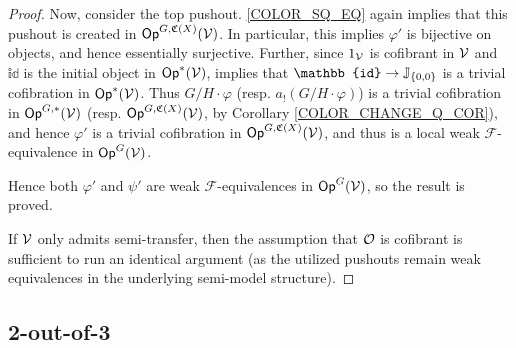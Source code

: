 \documentclass[a4paper,10pt
,draft
]{article}%
\renewcommand{\phi}{\varphi}
\renewcommand{\F}{\mathcal F}
\newcommand{\J}{\mathbb J}
\renewcommand{\1}{\ensuremath{\mathbb{id}}}
\begin{document}
\begin{proof}
      Now, consider the top pushout. \eqref{COLOR_SQ_EQ} again implies that this pushout is created in $\mathsf{Op}^{G, \mathfrak C(X)}(\mathcal V)$.
      In particular, this implies $\phi'$ is bijective on objects, and hence essentially surjective.
      Further, since $1_{\mathcal V}$ is cofibrant in $\mathcal V$ and $\1$ is the initial object in $\Op^{\**}(\V)$,
      \cite[Thm. 1.15]{BM13} implies that $\1 \to \J_{\set{0,0}}$ is a trivial cofibration in $\Op^{\**}(\V)$.
      Thus $G/H \cdot \phi$ (resp. $a_! (G/H \cdot \phi)$) is a trivial cofibration in $\Op^{G, \**}(\V)$
      (resp. $\mathsf{Op}^{G, \mathfrak C(X)}(\mathcal V)$, by Corollary \ref{COLOR_CHANGE_Q_COR}),
      and hence $\phi'$ is a trivial cofibration in $\mathsf{Op}^{G,\mathfrak C(X)}(\mathcal V)$,
      and thus is a local weak $\F$-equivalence in $\mathsf{Op}^G(\mathcal V)$.

      Hence both $\phi'$ and $\psi'$ are weak $\F$-equivalences in $\mathsf{Op}^G(\mathcal V)$, so the result is proved.

      If $\mathcal V$ only admits semi-transfer, then the assumption that $\mathcal{O}$ is cofibrant is sufficient to run an identical argument
      (as the utilized pushouts remain weak equivalences in the underlying semi-model structure).
\end{proof}


\subsection{2-out-of-3}
\end{document}

